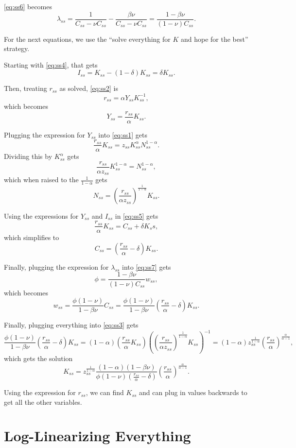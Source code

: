 \documentclass[11pt]{article}
\numberwithin{equation}{section} %
\numberwithin{figure}{section} %
\numberwithin{table}{section} %
\theoremstyle{definition}
\begin{document}
\ref{eq:ss6} becomes
\[
    \lambda_{ss} = \frac{1}{C_{ss} - \nu C_{ss}} - \frac{\beta \nu}{C_{ss} - \nu C_{ss}} = \frac{1 - \beta \nu}{(1-\nu) C_{ss}}.
\]

For the next equations, we use the ``solve everything for $K$ and hope for the best'' strategy.

Starting with \ref{eq:ss4}, that gets
\[
    I_{ss} = K_{ss} - (1 - \delta) K_{ss} = \delta K_{ss}.
\]

Then, treating $r_{ss}$ as solved, \ref{eq:ss2} is
\[
    r_{ss} = \alpha Y_{ss} K_{ss}^{-1},
\]
which becomes
\[
    Y_{ss} = \frac{r_{ss}}{\alpha} K_{ss}.
\]

Plugging the expression for $Y_{ss}$ into \ref{eq:ss1} gets
\[
    \frac{r_{ss}}{\alpha} K_{ss} = z_{ss} K_{ss}^\alpha N_{ss}^{1-\alpha}.
\]
Dividing this by $K_{ss}^\alpha$ gets
\[
    \frac{r_{ss}}{\alpha z_{ss}} K_{ss}^{1-\alpha} = N_{ss}^{1-\alpha},
\]
which when raised to the $\frac{1}{1-\alpha}$ gets
\[
    N_{ss} = \left(\frac{r_{ss}}{\alpha z_{ss}}\right)^{\frac{1}{1-\alpha}} K_{ss}.
\]

Using the expressions for $Y_{ss}$ and $I_{ss}$ in \ref{eq:ss5} gets
\[
    \frac{r_{ss}}{\alpha} K_{ss} = C_{ss} + \delta K_ss,
\]
which simplifies to
\[
    C_{ss} = \left(\frac{r_{ss}}{\alpha} - \delta\right) K_{ss}.
\]

Finally, plugging the expression for $\lambda_{ss}$ into \ref{eq:ss7} gets
\[
    \phi = \frac{1 - \beta \nu}{(1-\nu) C_{ss}} w_{ss},
\]
which becomes
\[
    w_{ss} = \frac{\phi (1-\nu)}{1-\beta\nu} C_{ss} = \frac{\phi (1-\nu)}{1-\beta\nu} \left(\frac{r_{ss}}{\alpha} - \delta\right) K_{ss}.
\]

Finally, plugging everything into \ref{eq:ss3} gets
\[
    \frac{\phi (1-\nu)}{1-\beta\nu} \left(\frac{r_{ss}}{\alpha} - \delta\right) K_{ss} = (1-\alpha) \left(\frac{r_{ss}}{\alpha} K_{ss}\right)\left(\left(\frac{r_{ss}}{\alpha z_{ss}}\right)^{\frac{1}{1-\alpha}} K_{ss}\right)^{-1} = (1-\alpha) z_{ss}^{\frac{1}{1-\alpha}} \left(\frac{r_{ss}}{\alpha}\right)^{\frac{\alpha}{\alpha-1}},
\]
which gets the solution
\[
    K_{ss} = z_{ss}^{\frac{1}{1-\alpha}} \frac{(1-\alpha)(1-\beta \nu)}{\phi (1 - \nu) \left(\frac{r_{ss}}{\alpha} - \delta\right)} \left(\frac{r_{ss}}{\alpha}\right)^{\frac{\alpha}{\alpha-1}}.
\]

Using the expression for $r_{ss}$, we can find $K_{ss}$ and can plug in values backwards to get all the other variables.


\section{Log-Linearizing Everything} \label{sec:ll}
\end{document}
